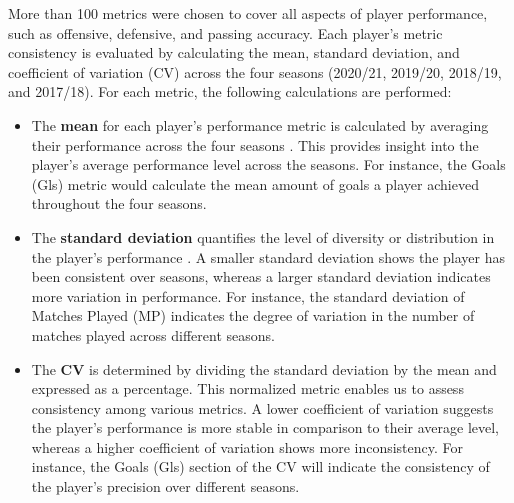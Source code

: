 \documentclass[12pt, a4paper,oneside]{book}
\numberwithin{equation}{section}
\begin{document}
More than 100 metrics were chosen to cover all aspects of player performance, such as offensive, defensive, and passing accuracy. Each player's metric consistency is evaluated by calculating the mean, standard deviation, and coefficient of variation (CV) across the four seasons (2020/21, 2019/20, 2018/19, and 2017/18). For each metric, the following calculations are performed:
\begin{itemize}
    \item The \textbf{mean} for each player’s performance metric is calculated by averaging their performance across the four seasons \cite{sokolova2017}. This provides insight into the player's average performance level across the seasons. For instance, the Goals (Gls) metric would calculate the mean amount of goals a player achieved throughout the four seasons.
    \item The \textbf{standard deviation} quantifies the level of diversity or distribution in the player's performance \cite{anderson2013}. A smaller standard deviation shows the player has been consistent over seasons,  whereas a larger standard deviation indicates more variation in performance. For instance, the standard deviation of Matches Played (MP) indicates the degree of variation in the number of matches played across different seasons.
    \item The \textbf{CV} is determined by dividing the standard deviation by the mean and expressed as a percentage. This normalized metric enables us to assess consistency among various metrics. A lower coefficient of variation suggests the player's performance is more stable in comparison to their average level, whereas a higher coefficient of variation shows more inconsistency.  For instance, the Goals (Gls) section of the CV will indicate the consistency of the player's precision over different seasons.
\end{itemize}

\begin{table}[ht]
    \centering
    \caption{Player Goals (Gls) and Matches Played (MP) Statistics}
\end{table}
\end{document}
